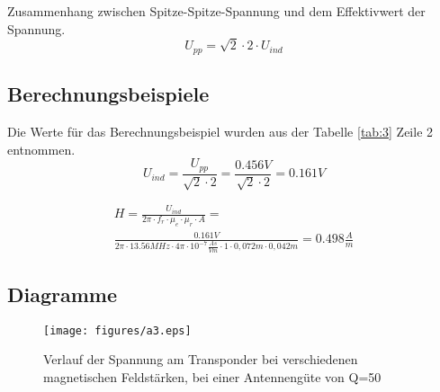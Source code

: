 \documentclass[12pt,a4paper,ngerman]{article}
\begin{document}
Zusammenhang zwischen Spitze-Spitze-Spannung und dem Effektivwert der Spannung.
\begin{equation}
U_{pp} = \sqrt{2}  \cdot 2 \cdot U_{ind}
\end{equation}
\subsection{Berechnungsbeispiele}
Die Werte für das Berechnungsbeispiel wurden aus der Tabelle \ref{tab:3} Zeile 2 entnommen.
\begin{equation}
U_{ind} = \frac{U_{pp}}{\sqrt{2}  \cdot 2} = \frac{0.456V}{\sqrt{2}  \cdot 2} = 0.161 V
\end{equation}

\begin{gather}
H = \frac{U_{ind}}{2\pi \cdot f_r \cdot \mu_e \cdot \mu_r \cdot A} = \\
\frac{0.161V}{2\pi \cdot 13.56MHz \cdot 4\pi \cdot 10^{-7}\frac{As}{Vm} \cdot 1 \cdot 0,072m \cdot 0,042m} = 0.498\frac{A}{m}
\end{gather}

\pagebreak
\subsection{Diagramme}
\begin{figure}[H]
\centering
\texttt{[image: figures/a3.eps]} 
\caption{Verlauf der Spannung am Transponder bei verschiedenen magnetischen Feldstärken, bei einer Antennengüte von Q=50}
\label{fig:3}
\end{figure}
\end{document}
